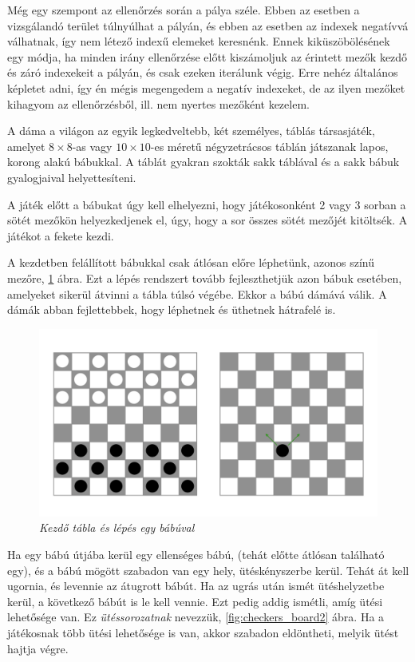 Még egy szempont az ellenőrzés során a pálya széle. Ebben az esetben a vizsgálandó terület túlnyúlhat a pályán, és ebben az esetben az indexek negatívvá válhatnak, így nem létező indexű elemeket keresnénk. Ennek kiküszöbölésének egy módja, ha minden irány ellenőrzése előtt kiszámoljuk az érintett mezők kezdő és záró indexekeit a pályán, és csak ezeken iterálunk végig. Erre nehéz általános képletet adni, így én mégis megengedem a negatív indexeket, de az ilyen mezőket kihagyom az ellenőrzésből,  ill. nem nyertes mezőként kezelem.


A dáma a világon az egyik legkedveltebb, két személyes, táblás társasjáték, amelyet $8 \times $8-as vagy $10 \times 10$-es méretű négyzetrácsos táblán játszanak lapos, korong alakú bábukkal. A táblát gyakran szokták sakk táblával és a sakk bábuk gyalogjaival helyettesíteni.


A játék előtt a bábukat úgy kell elhelyezni, hogy játékosonként 2 vagy 3 sorban a sötét mezőkön helyezkedjenek el, úgy, hogy a sor összes sötét mezőjét kitöltsék. A játékot a fekete kezdi.

A kezdetben felállított bábukkal csak átlósan előre léphetünk, azonos színű mezőre, \ref{fig:checkers_board1} ábra. Ezt a lépés rendszert tovább fejleszthetjük azon bábuk esetében, amelyeket sikerül átvinni a tábla túlsó végébe. Ekkor a bábú dámává válik. A dámák abban fejlettebbek, hogy léphetnek és üthetnek hátrafelé is.

\begin{figure}[!h]
	\centering
	\includegraphics[width=0.8\linewidth]{kepek/checkers_board.png}
	\caption{\textit{Kezdő tábla és lépés egy bábúval}}
	\label{fig:checkers_board1}
\end{figure}

Ha egy bábú útjába kerül egy ellenséges bábú, (tehát előtte átlósan található egy), és a bábú mögött szabadon van egy hely, ütéskényszerbe kerül. Tehát át kell ugornia, és levennie az átugrott bábút. Ha az ugrás után ismét ütéshelyzetbe kerül, a következő bábút is le kell vennie. Ezt pedig addig ismétli, amíg ütési lehetősége van. Ez \textit{ütéssorozatnak} nevezzük, \ref{fig:checkers_board2} ábra. Ha a játékosnak több ütési lehetősége is van, akkor szabadon eldöntheti, melyik ütést hajtja végre.

